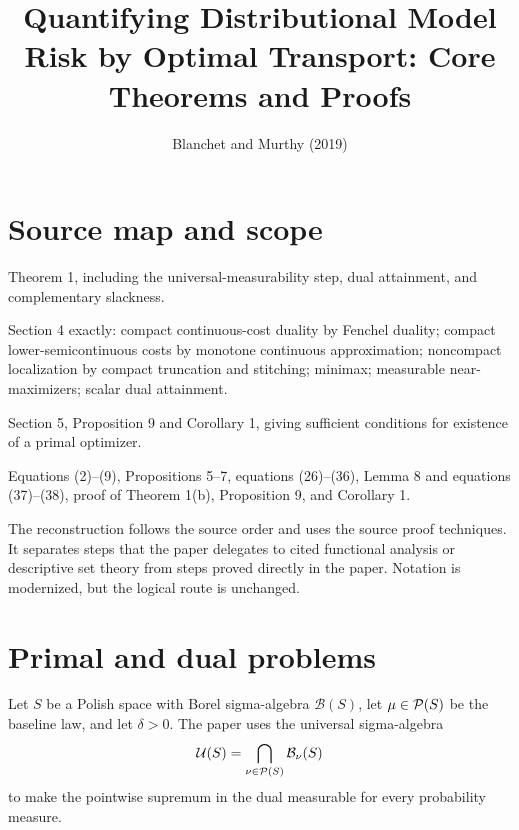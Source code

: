 
\title{Quantifying Distributional Model Risk by Optimal Transport: Core Theorems and Proofs}
\author{}
\date{Blanchet and Murthy (2019)}

\maketitle

\section*{Source map and scope}
\begin{sloppypar}
\begin{sourceguide}
\item[Primary source] 
\item[Target result] Theorem 1, including the universal-measurability step, dual attainment, and complementary slackness.
\item[Proof route] Section 4 exactly: compact continuous-cost duality by Fenchel duality; compact lower-semicontinuous costs by monotone continuous approximation; noncompact localization by compact truncation and stitching; minimax; measurable near-maximizers; scalar dual attainment.
\item[Additional result] Section 5, Proposition 9 and Corollary 1, giving sufficient conditions for existence of a primal optimizer.
\item[Anchors] Equations (2)--(9), Propositions 5--7, equations (26)--(36), Lemma 8 and equations (37)--(38), proof of Theorem 1(b), Proposition 9, and Corollary 1.
\end{sourceguide}
\end{sloppypar}

The reconstruction follows the source order and uses the source proof techniques.  It separates
steps that the paper delegates to cited functional analysis or descriptive set theory from steps
proved directly in the paper.  Notation is modernized, but the logical route is unchanged.

\section{Primal and dual problems}
Let $S$ be a Polish space with Borel sigma-algebra $\mathcal B(S)$, let $\mu\in\mathcal{P}(S)$ be the
baseline law, and let $\delta>0$.  The paper uses the universal sigma-algebra
\[
 \mathcal U(S)=\bigcap_{\nu\in\mathcal{P}(S)}\mathcal B_\nu(S)
\]
to make the pointwise supremum in the dual measurable for every probability measure.

